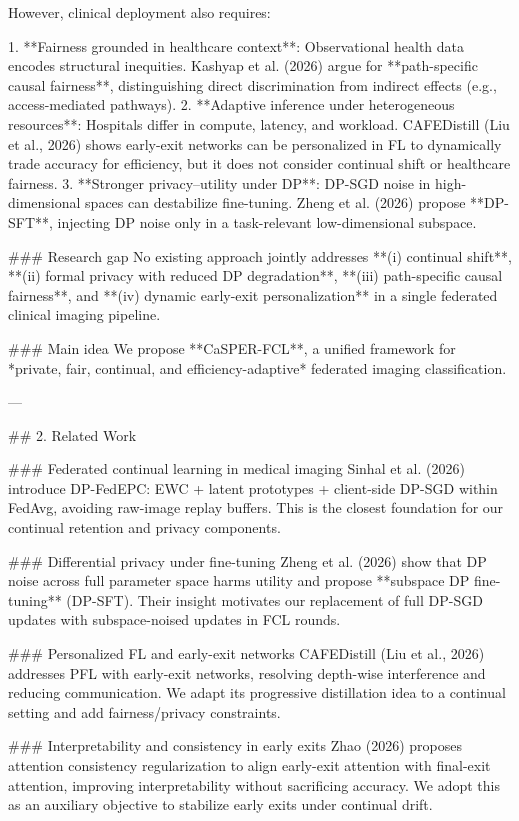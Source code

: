 However, clinical deployment also requires:  

1. **Fairness grounded in healthcare context**: Observational health data encodes structural inequities. Kashyap et al. (2026) argue for **path-specific causal fairness**, distinguishing direct discrimination from indirect effects (e.g., access-mediated pathways).  
2. **Adaptive inference under heterogeneous resources**: Hospitals differ in compute, latency, and workload. CAFEDistill (Liu et al., 2026) shows early-exit networks can be personalized in FL to dynamically trade accuracy for efficiency, but it does not consider continual shift or healthcare fairness.  
3. **Stronger privacy–utility under DP**: DP-SGD noise in high-dimensional spaces can destabilize fine-tuning. Zheng et al. (2026) propose **DP-SFT**, injecting DP noise only in a task-relevant low-dimensional subspace.

### Research gap  
No existing approach jointly addresses **(i) continual shift**, **(ii) formal privacy with reduced DP degradation**, **(iii) path-specific causal fairness**, and **(iv) dynamic early-exit personalization** in a single federated clinical imaging pipeline.

### Main idea  
We propose **CaSPER-FCL**, a unified framework for *private, fair, continual, and efficiency-adaptive* federated imaging classification.

---

## 2. Related Work  

### Federated continual learning in medical imaging  
Sinhal et al. (2026) introduce DP-FedEPC: EWC + latent prototypes + client-side DP-SGD within FedAvg, avoiding raw-image replay buffers. This is the closest foundation for our continual retention and privacy components.

### Differential privacy under fine-tuning  
Zheng et al. (2026) show that DP noise across full parameter space harms utility and propose **subspace DP fine-tuning** (DP-SFT). Their insight motivates our replacement of full DP-SGD updates with subspace-noised updates in FCL rounds.

### Personalized FL and early-exit networks  
CAFEDistill (Liu et al., 2026) addresses PFL with early-exit networks, resolving depth-wise interference and reducing communication. We adapt its progressive distillation idea to a continual setting and add fairness/privacy constraints.

### Interpretability and consistency in early exits  
Zhao (2026) proposes attention consistency regularization to align early-exit attention with final-exit attention, improving interpretability without sacrificing accuracy. We adopt this as an auxiliary objective to stabilize early exits under continual drift.

